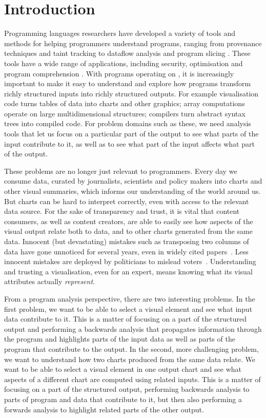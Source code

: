 \section{Introduction}

Programming languages researchers have developed a variety of tools and methods for helping programmers understand programs, ranging from provenance techniques and taint tracking to dataflow analysis and program slicing . These tools have a wide range of applications, including security, optimisation and program comprehension . With programs operating on , it is increasingly important to make it easy to understand and explore how programs transform richly structured inputs into richly structured outputs. For example visualisation code turns tables of data into charts and other graphics; array computations operate on large multidimensional structures; compilers turn abstract syntax trees into compiled code. For problem domains such as these, we need analysis tools that let us focus on a particular part of the output to see what parts of the input contribute to it, as well as to see what part of the input affects what part of the output. 

These problems are no longer just relevant to programmers. Every day we consume data, curated by journalists, scientists and policy makers into charts and other visual summaries, which informs our understanding of the world around us. But charts can be hard to interpret correctly, even with access to the relevant data source. For the sake of transparency and trust, it is vital that content consumers, as well as content creators, are able to easily see how aspects of the visual output relate both to data, and to other charts generated from the same data. Innocent (but devastating) mistakes such as transposing two columns of data have gone unnoticed for several years, even in widely cited papers~\cite{miller06}. Less innocent mistakes are deployed by politicians to mislead voters~\cite{fullfact19}. Understanding and trusting a visualisation, even for an expert, means knowing what its visual attributes actually \emph{represent}.

From a program analysis perspective, there are two interesting problems. In the first problem, we want to be able to select a visual element and see what input data contribute to it. This is a matter of focusing on a part of the structured output and performing a backwards analysis that propagates information through the program and highlights parts of the input data as well as parts of the program that contribute to the output. In the second, more challenging problem, we want to understand how two charts produced from the same data relate. We want to be able to select a visual element in one output chart and see what aspects of a different chart are computed using related inputs. This is a matter of focusing on a part of the structured output, performing backwards analysis to parts of program and data that contribute to it, but then also performing a forwards analysis to highlight related parts of the other output.

